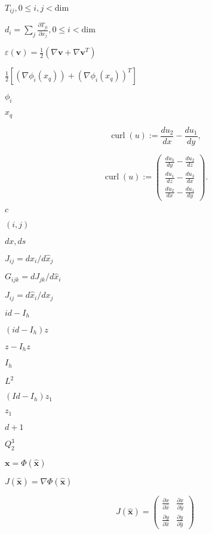 \documentclass{article}
\begin{document}
$T_{ij}, 0\le i,j<\text{dim}$
\pagebreak

$d_i = \sum_j \frac{\partial T_{ji}}{\partial x_j}, 0\le i<\text{dim}$
\pagebreak

$\varepsilon(\mathbf v)=\frac 12 (\nabla \mathbf v + \nabla \mathbf v^T)$
\pagebreak

$\frac 12 [(\nabla \phi_i(x_q)) + (\nabla \phi_i(x_q))^T]$
\pagebreak

$\phi_i$
\pagebreak

$x_q$
\pagebreak

\begin{equation*} \operatorname{curl}(u):=\frac{du_2}{dx} -\frac{du_1}{dy}, \end{equation*}
\pagebreak

\begin{equation*} \operatorname{curl}(u):=\left( \begin{array}{c} \frac{du_3}{dy}-\frac{du_2}{dz}\\ \frac{du_1}{dz}-\frac{du_3}{dx}\\ \frac{du_2}{dx}-\frac{du_1}{dy} \end{array} \right). \end{equation*}
\pagebreak

$c$
\pagebreak

$(i,j)$
\pagebreak

$dx, ds$
\pagebreak

$J_{ij}=dx_i/d\hat x_j$
\pagebreak

$G_{ijk}=dJ_{jk}/d\hat x_i$
\pagebreak

$J_{ij}=d\hat x_i/dx_j$
\pagebreak

$id-I_h$
\pagebreak

$(id-I_h)z$
\pagebreak

$z-I_hz$
\pagebreak

$I_h$
\pagebreak

$L^2$
\pagebreak

$(Id-I_h)z_1$
\pagebreak

$z_1$
\pagebreak

$d+1$
\pagebreak

$Q_2^3$
\pagebreak

$\mathbf x = \Phi(\mathbf{\hat x})$
\pagebreak

$J(\mathbf{\hat x}) = \nabla\Phi(\mathbf{\hat x})$
\pagebreak

\[ J(\mathbf{\hat x}) = \left(\begin{matrix} \frac{\partial x}{\partial \hat x} & \frac{\partial x}{\partial \hat y} \\ \frac{\partial y}{\partial \hat x} & \frac{\partial y}{\partial \hat y} \end{matrix}\right) \]
\pagebreak
\end{document}
